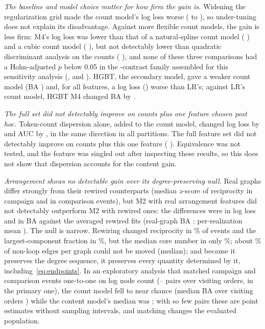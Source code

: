 \documentclass[conference]{IEEEtran}
\begin{document}
\emph{The baseline and model choice matter for how firm the gain is.} Widening the regularization grid made the count model's log loss worse (\RCountsQLL{} to \RHCountsLL), so under-tuning does not explain its disadvantage. Against more flexible count models, the gain is less firm: M4's log loss was lower than that of a natural-spline count model (\RFlexSplineLL{} \RFlexSplineLLCI) and a cubic count model (\RFlexCubicLL{} \RFlexCubicLLCI), but not detectably lower than quadratic discriminant analysis on the counts (\RFlexQDALL{} \RFlexQDALLCI), and none of these three comparisons had a Holm-adjusted $p$ below 0.05 in the \RTwHolmN-contrast family assembled for this sensitivity analysis (\RFlexSplineHolm, \RFlexCubicHolm{} and \RFlexQDAHolm). HGBT, the secondary model, gave a weaker count model (BA \RHGBTCountsBA) and, for all features, a log loss (\RHGBTAllLL) worse than LR's; against LR's count model, HGBT M4 changed BA by \RHGBTvsLRBA{} \RHGBTvsLRBACI.

\emph{The full set did not detectably improve on counts plus one feature chosen post hoc.} Token-count dispersion alone, added to the count model, changed log loss by \RTokCountsLL{} \RTokCountsLLCI{} and AUC by \RTokCountsAUC{} \RTokCountsAUCCI, in the same direction in all \RTokCountsFav{} partitions. The full feature set did not detectably improve on counts plus this one feature (\RTokMFourLL{} \RTokMFourLLCI). Equivalence was not tested, and the feature was singled out after inspecting these results, so this does not show that dispersion accounts for the content gain.

\emph{Arrangement shows no detectable gain over its degree-preserving null.} Real graphs differ strongly from their rewired counterparts (median $z$-score of reciprocity \RZRecipCamp{} in campaign and \RZRecipComp{} in comparison events), but M2 with real arrangement features did not detectably outperform M2 with rewired ones: the differences were \RNullDLL{} \RNullDLLCI{} in log loss and \RNullDBA{} \RNullDBACI{} in BA against the averaged rewired fits (real-graph BA \RNullRealBA; per-realization mean \RNullMeanBA). The null is narrow. Rewiring changed reciprocity in \RChRecipPct\% of events and the largest-component fraction in \RChWCCPct\%, but the median core number in only \RChCoreMedPct\%; about \RUnmovedPct\% of non-loop edges per graph could not be moved (median); and because it preserves the degree sequence, it preserves every quantity determined by it, including~\eqref{eq:endpoints}. In an exploratory analysis that matched campaign and comparison events one-to-one on log node count (\RPairsMin--\RPairsMax{} pairs over visiting orders, \RPairs{} in the primary one), the count model fell to near chance (median BA over visiting orders \RMatchCountsBA) while the content model's median was \RMatchContentBA; with so few pairs these are point estimates without sampling intervals, and matching changes the evaluated population.
\end{document}

